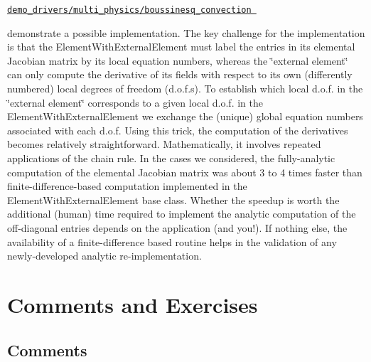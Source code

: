\begin{center} \href{../../../../demo_drivers/multi_physics/boussinesq_convection}{\tt demo\+\_\+drivers/multi\+\_\+physics/boussinesq\+\_\+convection } \end{center} 

demonstrate a possible implementation. The key challenge for the implementation is that the {\ttfamily Element\+With\+External\+Element} must label the entries in its elemental Jacobian matrix by its local equation numbers, whereas the \char`\"{}external element\char`\"{} can only compute the derivative of its fields with respect to its own (differently numbered) local degrees of freedom (d.\+o.\+f.\+s). To establish which local d.\+o.\+f. in the \char`\"{}external element\char`\"{} corresponds to a given local d.\+o.\+f. in the {\ttfamily Element\+With\+External\+Element} we exchange the (unique) global equation numbers associated with each d.\+o.\+f. Using this trick, the computation of the derivatives becomes relatively straightforward. Mathematically, it involves repeated applications of the chain rule. In the cases we considered, the fully-\/analytic computation of the elemental Jacobian matrix was about 3 to 4 times faster than finite-\/difference-\/based computation implemented in the {\ttfamily Element\+With\+External\+Element} base class. Whether the speedup is worth the additional (human) time required to implement the analytic computation of the off-\/diagonal entries depends on the application (and you!). If nothing else, the availability of a finite-\/difference based routine helps in the validation of any newly-\/developed analytic re-\/implementation.



 

\hypertarget{index_comm_and_ex}{}\section{Comments and Exercises}\label{index_comm_and_ex}
\hypertarget{index_comments}{}\subsection{Comments}\label{index_comments}

